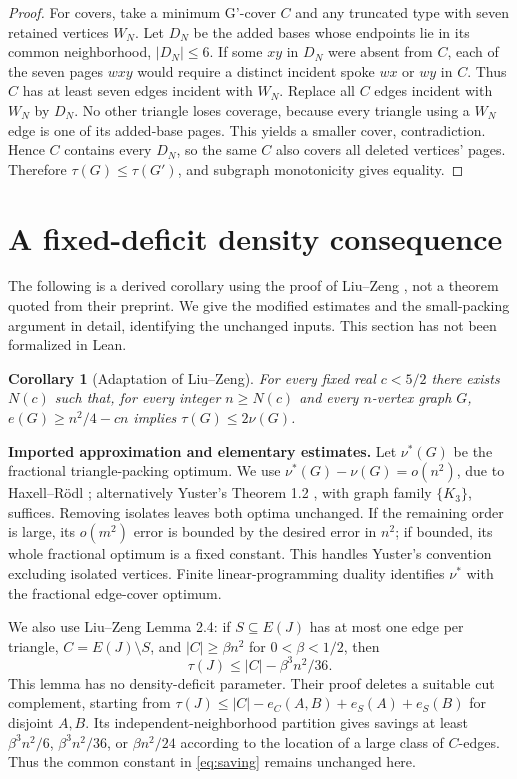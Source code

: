 \documentclass[11pt]{article}
\newtheorem{corollary}[theorem]{Corollary}
\theoremstyle{definition}\newtheorem{definition}[theorem]{Definition}
\theoremstyle{remark}\newtheorem{remark}[theorem]{Remark}
\begin{document}
\begin{proof}
For covers, take a minimum G'-cover \(C\) and any truncated type with seven retained vertices \(W_N\). Let \(D_N\) be the added bases whose endpoints lie in its common neighborhood, \(|D_N|\le 6\). If some \(xy\) in \(D_N\) were absent from \(C\), each of the seven pages \(wxy\) would require a distinct incident spoke \(wx\) or \(wy\) in \(C\). Thus \(C\) has at least seven edges incident with \(W_N\). Replace all \(C\) edges incident with \(W_N\) by \(D_N\). No other triangle loses coverage, because every triangle using a \(W_N\) edge is one of its added-base pages. This yields a smaller cover, contradiction. Hence \(C\) contains every \(D_N\), so the same \(C\) also covers all deleted vertices' pages. Therefore \(\tau(G)\le \tau(G')\), and subgraph monotonicity gives equality.
\end{proof}

\section{A fixed-deficit density consequence}\label{sec:density}

The following is a derived corollary using the proof of Liu--Zeng
\cite{LZ}, not a theorem quoted from their preprint. We give the modified
estimates and the small-packing argument in detail, identifying the
unchanged inputs. This section has not been formalized in Lean.

\begin{corollary}[Adaptation of Liu--Zeng]\label{cor:density}
For every fixed real $c<5/2$ there exists $N(c)$ such that, for every
integer $n\ge N(c)$ and every $n$-vertex graph $G$,
$e(G)\ge n^2/4-cn$ implies $\tau(G)\le2\nu(G)$.
\end{corollary}

\par\medskip\noindent\textbf{Imported approximation and elementary estimates.}
Let $\nu^*(G)$ be the fractional triangle-packing optimum. We use
$\nu^*(G)-\nu(G)=o(n^2)$, due to Haxell--R\"odl \cite{HR}; alternatively
Yuster's Theorem 1.2 \cite{Yuster}, with graph family $\{K_3\}$, suffices.
Removing isolates leaves both optima unchanged. If the remaining order
is large, its $o(m^2)$ error is bounded by the desired error in $n^2$;
if bounded, its whole fractional optimum is a fixed constant. This
handles Yuster's convention excluding isolated vertices.
Finite linear-programming duality identifies $\nu^*$ with the fractional
edge-cover optimum.

We also use Liu--Zeng Lemma 2.4: if $S\subseteq E(J)$ has at most one
edge per triangle, $C=E(J)\setminus S$, and $|C|\ge\beta n^2$ for
$0<\beta<1/2$, then
\begin{equation}\label{eq:saving}
\tau(J)\le |C|-\beta^3n^2/36.
\end{equation}
This lemma has no density-deficit parameter. Their proof deletes a
suitable cut complement, starting from
$\tau(J)\le|C|-e_C(A,B)+e_S(A)+e_S(B)$ for disjoint $A,B$.
Its independent-neighborhood partition gives savings at least
$\beta^3n^2/6$, $\beta^3n^2/36$, or $\beta n^2/24$ according to the
location of a large class of $C$-edges. Thus the common constant in
\eqref{eq:saving} remains unchanged here.
\end{document}
